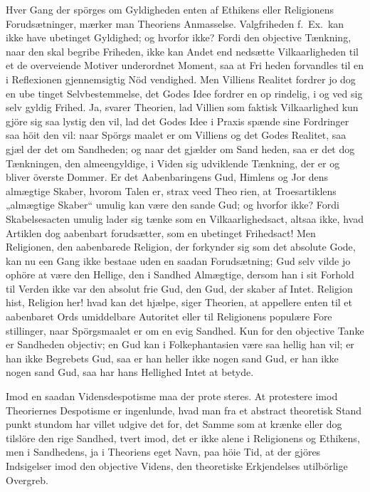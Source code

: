 \documentclass[12pt,a4paper]{article}
\newcommand{\opage}[1]{\marginnote{\footnotesize\textit{[#1]}}}
\begin{document}
Hver Gang der spörges om Gyldigheden enten af
Ethikens eller Religionens Forudsætninger, mærker man
Theoriens Anmasselse. Valgfriheden f.\ Ex.\ kan ikke
have ubetinget Gyldighed; og hvorfor ikke? Fordi den
objective Tænkning, naar den skal begribe Friheden,
ikke kan Andet end nedsætte Vilkaarligheden til et de
overveiende Motiver underordnet Moment, saa at Fri\-%
heden forvandles til en i Reflexionen gjennemsigtig Nöd\-%
vendighed. Men Villiens Realitet fordrer jo dog en ube\-%
tinget Selvbestemmelse, det Godes Idee fordrer en op\-%
rindelig, i og ved sig selv gyldig Frihed. Ja, svarer
Theorien, lad Villien som faktisk Vilkaarlighed kun gjöre
sig saa lystig den vil, lad det Godes Idee i Praxis
spænde sine Fordringer saa höit den vil: naar Spörgs\-%
maalet er om Villiens og det Godes Realitet, saa gjæl\-%
der det om Sandheden; og naar det gjælder om Sand\-%
heden, saa er det dog Tænkningen, den almeengyldige,
i Viden sig udviklende Tænkning, der er og bliver överste
Dommer. Er det Aabenbaringens Gud, Himlens og Jor\-%
dens almægtige Skaber, hvorom Talen er, strax veed Theo\-%
rien, at Troesartiklens „almægtige Skaber“ umulig kan være
den sande Gud; og hvorfor ikke? Fordi Skabelsesacten
umulig lader sig tænke som en Vilkaarlighedsact, altsaa
ikke, hvad Artiklen dog aabenbart forudsætter, som en
ubetinget Frihedsact! Men Religionen, den aabenbarede
Religion, der forkynder sig som det absolute Gode, kan
nu een Gang ikke bestaae uden en saadan Forudsætning;
\opage{71}Gud selv vilde jo ophöre at være den Hellige, den i
Sandhed Almægtige, dersom han i sit Forhold til Verden
ikke var den absolut frie Gud, den Gud, der skaber af
Intet. Religion hist, Religion her! hvad kan det hjælpe,
siger Theorien, at appellere enten til et aabenbaret Ords
umiddelbare Autoritet eller til Religionens populære Fore\-%
stillinger, naar Spörgsmaalet er om en evig Sandhed.
Kun for den objective Tanke er Sandheden objectiv; en
Gud kan i Folkephantasien være saa hellig han vil; er
han ikke Begrebets Gud, saa er han heller ikke nogen
sand Gud, er han ikke nogen sand Gud, saa har hans
Hellighed Intet at betyde.

Imod en saadan Vidensdespotisme maa der prote\-%
steres. At protestere imod Theoriernes Despotisme er
ingenlunde, hvad man fra et abstract theoretisk Stand\-%
punkt stundom har villet udgive det for, det Samme
som at krænke eller dog tilslöre den rige Sandhed, tvert\-%
imod, det er ikke alene i Religionens og Ethikens, men
i Sandhedens, ja i Theoriens eget Navn, paa höie Tid,
at der gjöres Indsigelser imod den objective Videns, den
theoretiske Erkjendelses utilbörlige Overgreb.
\end{document}
